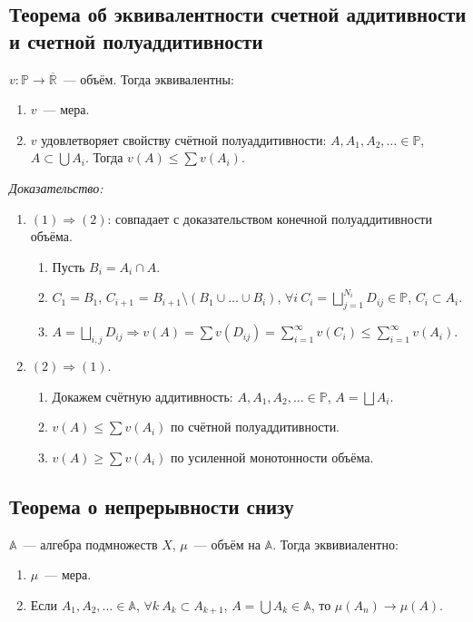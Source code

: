 \documentclass[paper=a4, fontsize=11pt]{article}
\begin{document}
\subsection{Теорема об эквивалентности счетной аддитивности и счетной полуаддитивности}
$v: \mathds{P} \rightarrow \overline{\mathds{R}}$~--- объём. Тогда эквивалентны:
\begin{enumerate}
    \item $v$~--- мера.
    \item $v$ удовлетворяет свойству счётной полуаддитивности:
    $A,A_1,A_2,\dots \in \mathds{P}$, $A \subset \bigcup A_i$. Тогда $v(A) \leq \sum v(A_i)$.
\end{enumerate}

\emph{Доказательство:}
\begin{enumerate}
    \item $(1) \Rightarrow (2)$: совпадает с доказательством конечной полуаддитивности объёма.
    \begin{enumerate}
        \item Пусть $B_i = A_i \cap A$.
        \item $C_1 = B_1$, $C_{i+1}$ = $B_{i+1} \setminus (B_1 \cup \dots \cup B_i)$,
        $\forall i\ C_i = \bigsqcup_{j=1}^{N_i} D_{ij} \in \mathds{P}$, $C_i \subset A_i$.
        \item $A = \bigsqcup_{i,j} D_{ij} \Rightarrow v(A) = \sum v(D_{ij}) = \sum_{i=1}^{\infty} v(C_i) \leq \sum_{i=1}^{\infty} v(A_i)$.
    \end{enumerate}
    \item $(2) \Rightarrow (1)$.
    \begin{enumerate}
        \item Докажем счётную аддитивность: $A,A_1,A_2,\dots \in \mathds{P}$, $A = \bigsqcup A_i$.
        \item $v(A) \leq \sum v(A_i)$ по счётной полуаддитивности.
        \item $v(A) \geq \sum v(A_i)$ по усиленной монотонности объёма.
    \end{enumerate}
\end{enumerate}

\subsection{Теорема о непрерывности снизу}
$\mathds{A}$~--- алгебра подмножеств $X$, $\mu$~--- объём на $\mathds{A}$. Тогда эквивиалентно:
\begin{enumerate}
    \item $\mu$~--- мера.
    \item Если $A_1,A_2,\dots \in \mathds{A}$, $\forall k\ A_k \subset A_{k+1}$, $A = \bigcup A_k \in \mathds{A}$, то
    $\mu(A_n) \to \mu(A)$.
\end{enumerate}
\end{document}
